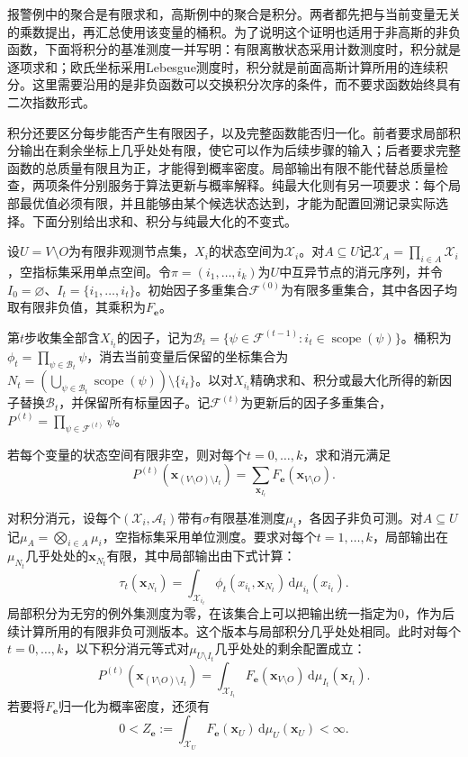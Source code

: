 报警例中的聚合是有限求和，高斯例中的聚合是积分。两者都先把与当前变量无关的乘数提出，再汇总使用该变量的桶积。为了说明这个证明也适用于非高斯的非负函数，下面将积分的基准测度一并写明：有限离散状态采用计数测度时，积分就是逐项求和；欧氏坐标采用Lebesgue测度时，积分就是前面高斯计算所用的连续积分。这里需要沿用的是非负函数可以交换积分次序的条件，而不要求函数始终具有二次指数形式。

积分还要区分每步能否产生有限因子，以及完整函数能否归一化。前者要求局部积分输出在剩余坐标上几乎处处有限，使它可以作为后续步骤的输入；后者要求完整函数的总质量有限且为正，才能得到概率密度。局部输出有限不能代替总质量检查，两项条件分别服务于算法更新与概率解释。纯最大化则有另一项要求：每个局部最优值必须有限，并且能够由某个候选状态达到，才能为配置回溯记录实际选择。下面分别给出求和、积分与纯最大化的不变式。

\begin{theorem}[同类消元的不变式]
  \label{thm:pgm-elimination-invariant}
  设$U=V\setminus O$为有限非观测节点集，$X_i$的状态空间为$\mathcal{X}_i$。对$A\subseteq U$记$\mathcal{X}_A=\prod_{i\in A}\mathcal{X}_i$，空指标集采用单点空间。令$\pi=(i_1,\ldots,i_k)$为$U$中互异节点的消元序列，并令$I_0=\varnothing$、$I_t=\{i_1,\ldots,i_t\}$。初始因子多重集合$\mathcal{F}^{(0)}$为有限多重集合，其中各因子均取有限非负值，其乘积为$F_{\bm{e}}$。

  第$t$步收集全部含$X_{i_t}$的因子，记为$\mathcal{B}_t=\{\psi\in\mathcal{F}^{(t-1)}:i_t\in\operatorname{scope}(\psi)\}$。桶积为$\phi_t=\prod_{\psi\in\mathcal{B}_t}\psi$，消去当前变量后保留的坐标集合为$N_t=(\bigcup_{\psi\in\mathcal{B}_t}\operatorname{scope}(\psi))\setminus\{i_t\}$。以对$X_{i_t}$精确求和、积分或最大化所得的新因子替换$\mathcal{B}_t$，并保留所有标量因子。记$\mathcal{F}^{(t)}$为更新后的因子多重集合，$P^{(t)}=\prod_{\psi\in\mathcal{F}^{(t)}}\psi$。

  若每个变量的状态空间有限非空，则对每个$t=0,\ldots,k$，求和消元满足
  \[
    P^{(t)}(\bm{x}_{(V\setminus O)\setminus I_t})
    =\sum_{\bm{x}_{I_t}}F_{\bm{e}}(\bm{x}_{V\setminus O}).
  \]

  对积分消元，设每个$(\mathcal{X}_i,\mathcal{A}_i)$带有$\sigma$有限基准测度$\mu_i$，各因子非负可测。对$A\subseteq U$记$\mu_A=\bigotimes_{i\in A}\mu_i$，空指标集采用单位测度。要求对每个$t=1,\ldots,k$，局部输出在$\mu_{N_t}$几乎处处的$\bm{x}_{N_t}$有限，其中局部输出由下式计算：
  \[
    \tau_t(\bm{x}_{N_t})
      =\int_{\mathcal{X}_{i_t}}
         \phi_t(x_{i_t},\bm{x}_{N_t})\,\mathrm{d}\mu_{i_t}(x_{i_t}).
  \]
  局部积分为无穷的例外集测度为零，在该集合上可以把输出统一指定为$0$，作为后续计算所用的有限非负可测版本。这个版本与局部积分几乎处处相同。此时对每个$t=0,\ldots,k$，以下积分消元等式对$\mu_{U\setminus I_t}$几乎处处的剩余配置成立：
  \[
    P^{(t)}(\bm{x}_{(V\setminus O)\setminus I_t})
    =\int_{\mathcal{X}_{I_t}}
       F_{\bm{e}}(\bm{x}_{V\setminus O})\,
       \mathrm{d}\mu_{I_t}(\bm{x}_{I_t}).
  \]
  若要将$F_{\bm e}$归一化为概率密度，还须有
  \[
    0<Z_{\bm e}\mathrel{:=}
      \int_{\mathcal{X}_U}F_{\bm e}(\bm{x}_U)\,
      \mathrm{d}\mu_U(\bm{x}_U)<\infty.
  \]


\end{theorem}
